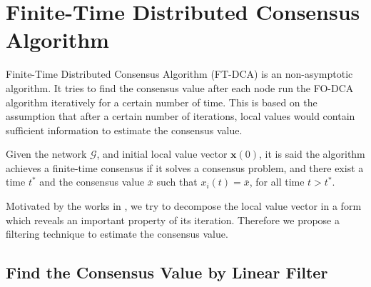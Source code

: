 
\section{\label{sec:Finite-Time-Distributed-Consensu}Finite-Time Distributed
Consensus Algorithm}

Finite-Time Distributed Consensus Algorithm (FT-DCA) is an non-asymptotic
algorithm. It tries to find the consensus value after each node run
the FO-DCA algorithm iteratively for a certain number of time. This
is based on the assumption that after a certain number of iterations,
local values would contain sufficient information to estimate the
consensus value.  
\begin{defn}
Given the network $\mathcal{G}$, and initial local value vector $\mathbf{x}\left(0\right)$,
it is said the algorithm achieves a finite-time consensus if it solves
a consensus problem, and there exist a time $t^{*}$ and the consensus
value $\bar{x}$ such that $x_{i}\left(t\right)=\bar{x}$, for all
time $t>t^{*}$. 
\end{defn}
Motivated by the works in \cite{Kokiopoulou2007}, we try to decompose
the local value vector in a form which reveals an important property
of its iteration. Therefore we propose a filtering technique to estimate
the consensus value. 


\subsection{\label{sub:Find_Consensus_Value}Find the Consensus Value by Linear
Filter}

